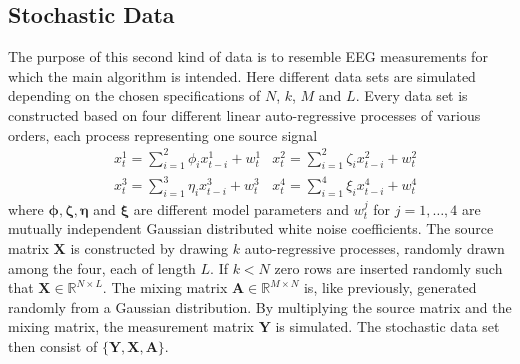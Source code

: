 \subsection{Stochastic Data}\label{sec:stoch_data}
The purpose of this second kind of data is to resemble EEG measurements for which the main algorithm is intended. 
Here different data sets are simulated depending on the chosen specifications of $N$, $k$, $M$ and $L$. 
Every data set is constructed based on four different linear auto-regressive processes of various orders, each process representing one source signal
\begin{align*}
&x_{t}^{1} = \sum_{i=1}^{2} \phi_i x_{t-i}^{1} + w_t^{1} &x_{t}^{2} = \sum_{i=1}^{2} \zeta_i x_{t-i}^{2} + w_t^{2} \\
&x_{t}^{3} = \sum_{i=1}^{3} \eta_i x_{t-i}^{3} + w_t^{3}  &x_{t}^{4} = \sum_{i=1}^{4} \xi_i x_{t-i}^{4} + w_t^{4}
\end{align*}
where $\boldsymbol{\phi}, \boldsymbol{\zeta}, \boldsymbol{\eta}$ and $\boldsymbol{\xi}$ are different model parameters and $w_t^{j}$ for $j = 1,\dots ,4$ are mutually independent Gaussian distributed white noise coefficients.
The source matrix $\mathbf{X}$ is constructed by drawing $k$ auto-regressive processes, randomly drawn among the four, each of length $L$. 
If $k < N$ zero rows are inserted randomly such that $\mathbf{X} \in \mathbb{R}^{N \times L}$. 
The mixing matrix $\mathbf{A} \in \mathbb{R}^{M \times N}$ is, like previously, generated randomly from a Gaussian distribution.
By multiplying the source matrix and the mixing matrix, the measurement matrix $\mathbf{Y}$ is simulated. 
The stochastic data set then consist of $\{ \mathbf{Y}, \mathbf{X}, \mathbf{A} \}$. 


